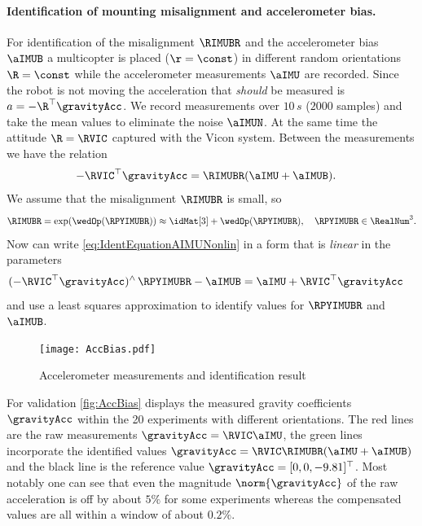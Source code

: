 \paragraph*{Identification of mounting misalignment and accelerometer bias.}
For identification of the misalignment $\RIMUBR$ and the accelerometer bias $\aIMUB$ a multicopter is placed ($\r = \const$) in different random orientations $\R = \const$ while the accelerometer measurements $\aIMU$ are recorded.
Since the robot is not moving the acceleration that \textit{should} be measured is $a = -\R^\top \gravityAcc$.
We record measurements over $10\,\unit{s}$ ($2000$ samples) and take the mean values to eliminate the noise $\aIMUN$.
At the same time the attitude $\R = \RVIC$ captured with the Vicon system.
Between the measurements we have the relation
\begin{align}
 -\RVIC^\top \gravityAcc &= \RIMUBR (\aIMU + \aIMUB).
\label{eq:IdentEquationAIMUNonlin}
\end{align}
We assume that the misalignment $\RIMUBR$ is small, so 
\begin{align}
 \RIMUBR = \exp (\wedOp(\RPYIMUBR)) \approx \idMat[3] + \wedOp(\RPYIMUBR), \quad \RPYIMUBR \in \RealNum^3.
\end{align}
Now can write \eqref{eq:IdentEquationAIMUNonlin} in a form that is \textit{linear} in the parameters 
\begin{align}
 (-\RVIC^\top \gravityAcc)^\wedge \, \RPYIMUBR - \aIMUB &= \aIMU + \RVIC^\top \gravityAcc
\end{align}
and use a least squares approximation to identify values for $\RPYIMUBR$ and $\aIMUB$.

\begin{figure}[htb]
 \centering
 \texttt{[image: AccBias.pdf]}
 \caption{Accelerometer measurements and identification result}
 \label{fig:AccBias}
\end{figure}

For validation \autoref{fig:AccBias} displays the measured gravity coefficients $\gravityAcc$ within the 20 experiments with different orientations.
The red lines are the raw measurements $\gravityAcc = \RVIC \aIMU$, the green lines incorporate the identified values $\gravityAcc = \RVIC \RIMUBR (\aIMU + \aIMUB)$ and the black line is the reference value $\gravityAcc = [0,0,-9.81]^\top$.
Most notably one can see that even the magnitude $\norm{\gravityAcc}$ of the raw acceleration is off by about $5\%$ for some experiments whereas the compensated values are all within a window of about $0.2\%$.

